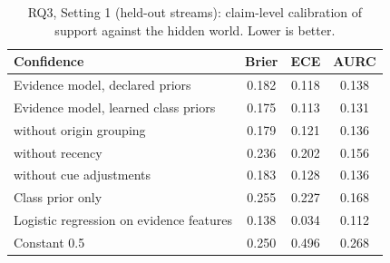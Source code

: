 \begin{table}[t]\centering\small
\caption{RQ3, Setting 1 (held-out streams): claim-level calibration of support against the hidden world. Lower is better.}\label{tab:rq3}
\begin{tabular}{lccc}
\toprule
Confidence & Brier & ECE & AURC \\
\midrule
Evidence model, declared priors & 0.182 & 0.118 & 0.138 \\
Evidence model, learned class priors & 0.175 & 0.113 & 0.131 \\
\quad without origin grouping & 0.179 & 0.121 & 0.136 \\
\quad without recency & 0.236 & 0.202 & 0.156 \\
\quad without cue adjustments & 0.183 & 0.128 & 0.136 \\
Class prior only & 0.255 & 0.227 & 0.168 \\
Logistic regression on evidence features & 0.138 & 0.034 & 0.112 \\
Constant 0.5 & 0.250 & 0.496 & 0.268 \\
\bottomrule
\end{tabular}
\end{table}